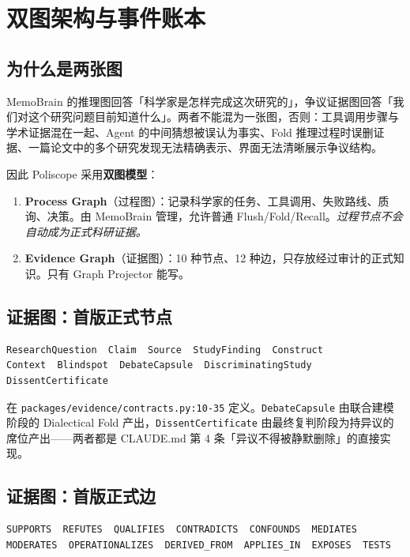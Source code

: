 \section{双图架构与事件账本}

\subsection{为什么是两张图}

MemoBrain 的推理图回答「科学家是怎样完成这次研究的」，争议证据图回答「我们对这个研究问题目前知道什么」。两者不能混为一张图，否则：工具调用步骤与学术证据混在一起、Agent 的中间猜想被误认为事实、Fold 推理过程时误删证据、一篇论文中的多个研究发现无法精确表示、界面无法清晰展示争议结构。

因此 Poliscope 采用\textbf{双图模型}：

\begin{enumerate}
\item \textbf{Process Graph}（过程图）：记录科学家的任务、工具调用、失败路线、质询、决策。由 MemoBrain 管理，允许普通 Flush/Fold/Recall。\emph{过程节点不会自动成为正式科研证据。}
\item \textbf{Evidence Graph}（证据图）：10 种节点、12 种边，只存放经过审计的正式知识。只有 Graph Projector 能写。
\end{enumerate}

\subsection{证据图：首版正式节点}

\begin{verbatim}
ResearchQuestion  Claim  Source  StudyFinding  Construct
Context  Blindspot  DebateCapsule  DiscriminatingStudy  DissentCertificate
\end{verbatim}

在 \texttt{packages/evidence/contracts.py:10-35} 定义。\texttt{DebateCapsule} 由联合建模阶段的 Dialectical Fold 产出，\texttt{DissentCertificate} 由最终复判阶段为持异议的席位产出——两者都是 CLAUDE.md 第 4 条「异议不得被静默删除」的直接实现。

\subsection{证据图：首版正式边}

\begin{verbatim}
SUPPORTS  REFUTES  QUALIFIES  CONTRADICTS  CONFOUNDS  MEDIATES
MODERATES  OPERATIONALIZES  DERIVED_FROM  APPLIES_IN  EXPOSES  TESTS
\end{verbatim}


